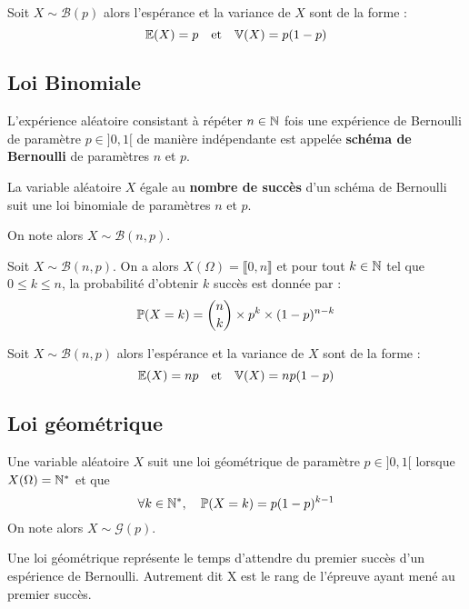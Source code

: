 \begin{proposition}
    Soit $X \sim \mathcal{B}(p)$ alors l'espérance et la variance de $X$ sont de la forme :
        \[ \mathbb{E}(X) = p \quad \text{et} \quad \mathbb{V}(X) = p(1-p)  \] 
\end{proposition}

\subsection{Loi Binomiale}

L'expérience aléatoire consistant à répéter $n \in \mathbb{N}$ fois une expérience de Bernoulli de paramètre $ p \in ]0,1[$
de {manière indépendante} est appelée \textbf{schéma de Bernoulli} de paramètres $n$ et $p$. 

\begin{definition}
    La variable aléatoire $X$ égale au \textbf{nombre de succès} d'un schéma de Bernoulli suit une {loi binomiale} 
    de paramètres $n$ et $p$. 

    On note alors $X \sim \mathcal{B}(n,p)$. 
\end{definition}

\begin{proposition}
    Soit $X \sim \mathcal{B}(n,p)$. On a alors $X(\Omega) = \llbracket 0, n \rrbracket$ et pour tout $k \in \mathbb{N}$ tel que 
    $0 \leqslant k \leqslant n $, {la probabilité d'obtenir $k$ succès} est donnée par :
        \[ \mathbb{P}(X = k) = \binom{n}{k} \times p^k \times (1-p)^{n-k}  \] 
\end{proposition}

\begin{proposition}
    Soit $X \sim \mathcal{B}(n,p)$ alors l'espérance et la variance de $X$ sont de la forme :
        \[ \mathbb{E}(X) = np \quad \text{et} \quad \mathbb{V}(X) = np(1-p)  \] 
\end{proposition}

\subsection{Loi géométrique}

\begin{definition}
    Une variable aléatoire $X$ suit une loi géométrique de paramètre $p \in ]0,1[$ lorsque $X(\Omega) = \mathbb{N}^*$ et que 
        \[ \forall k \in \mathbb{N}^*, \quad \mathbb{P}(X = k) = p(1-p)^{k-1}  \] 
    On note alors $X \sim \mathcal{G}(p)$. 
\end{definition}

Une loi géométrique représente le temps d'attendre du premier succès d'un espérience de Bernoulli. 
Autrement dit X est le rang de l'épreuve ayant mené au premier succès. 


